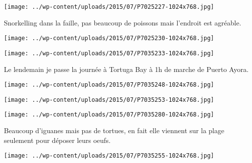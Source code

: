  

\begin{center} \texttt{[image: ../wp-content/uploads/2015/07/P7025227-1024x768.jpg]} \end{center}

 

 Snorkelling dans la faille, pas beaucoup de poissons mais l'endroit est agréable. 

 

\begin{center} \texttt{[image: ../wp-content/uploads/2015/07/P7025230-1024x768.jpg]} \end{center}

 

 

\begin{center} \texttt{[image: ../wp-content/uploads/2015/07/P7035233-1024x768.jpg]} \end{center}

 

 Le lendemain je passe la journée à Tortuga Bay à 1h de marche de Puerto Ayora. 

 

\begin{center} \texttt{[image: ../wp-content/uploads/2015/07/P7035248-1024x768.jpg]} \end{center}

 

 

\begin{center} \texttt{[image: ../wp-content/uploads/2015/07/P7035253-1024x768.jpg]} \end{center}

 

 

\begin{center} \texttt{[image: ../wp-content/uploads/2015/07/P7035280-1024x768.jpg]} \end{center}

 

 Beaucoup d'iguanes mais pas de tortues, en fait elle viennent sur la plage seulement pour déposer leurs oeufs. 

 

\begin{center} \texttt{[image: ../wp-content/uploads/2015/07/P7035255-1024x768.jpg]} \end{center}

